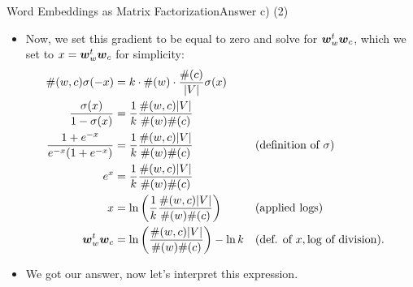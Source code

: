 \documentclass[t]{beamer}
\begin{document}
\begin{frame}{Word Embeddings as Matrix Factorization}{Answer c) (2)}
    \begin{itemize}
        \item Now, we set this gradient to be equal to zero and solve for
              ${\boldsymbol{w}}_{w}^t{\boldsymbol{w}}_{c}$, which we set to $x = {\boldsymbol{w}}_{w}^t{\boldsymbol{w}}_{c}$ for
              simplicity:
              {\tiny
              \begin{align*}
                  \#(w,c)\sigma(-x)                 & = k\cdot\#(w)\cdot\frac{\#(c)}{|V|}\sigma(x)                                                                 \\
                  \frac{\sigma(x)}{1 - \sigma(x)}   & = \frac{1}{k}\frac{\#(w,c)|V|}{\#(w)\#(c)}                                                                   \\
                  \frac{1+e^{-x}}{e^{-x}(1+e^{-x})} & = \frac{1}{k}\frac{\#(w,c)|V|}{\#(w)\#(c)}                 &  & (\text{definition of }\sigma)                \\
                  e^{x}                             & = \frac{1}{k}\frac{\#(w,c)|V|}{\#(w)\#(c)}                                                                   \\
                  x                                 & = \ln\left(\frac{1}{k}\frac{\#(w,c)|V|}{\#(w)\#(c)}\right) &  & (\text{applied logs})                        \\
                  {\boldsymbol{w}}_{w}^t{\boldsymbol{w}}_{c}                  & = \ln\left(\frac{\#(w,c)|V|}{\#(w)\#(c)}\right) - \ln k    &  & (\text{def. of } x, \text{log of division}). \\
              \end{align*}
              }
        \item We got our answer, now let's interpret this expression.
    \end{itemize}
\end{frame}
\end{document}
